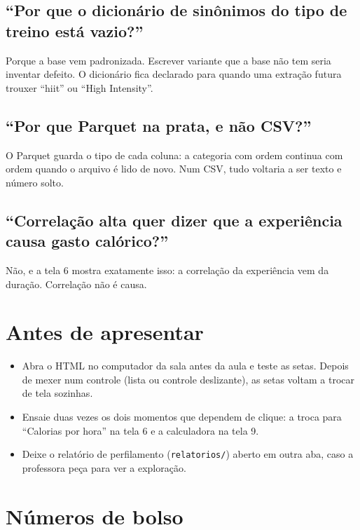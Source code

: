 \documentclass[12pt,a4paper]{article}
\begin{document}
\subsection*{``Por que o dicionário de sinônimos do tipo de treino está vazio?''}
Porque a base vem padronizada. Escrever variante que a base não tem seria inventar defeito. O dicionário fica declarado para quando uma extração futura trouxer ``hiit'' ou ``High Intensity''.

\subsection*{``Por que Parquet na prata, e não CSV?''}
O Parquet guarda o tipo de cada coluna: a categoria com ordem continua com ordem quando o arquivo é lido de novo. Num CSV, tudo voltaria a ser texto e número solto.

\subsection*{``Correlação alta quer dizer que a experiência causa gasto calórico?''}
Não, e a tela 6 mostra exatamente isso: a correlação da experiência vem da duração. Correlação não é causa.

\section{Antes de apresentar}

\begin{itemize}
  \item Abra o HTML no computador da sala antes da aula e teste as setas. Depois de mexer num controle (lista ou controle deslizante), as setas voltam a trocar de tela sozinhas.
  \item Ensaie duas vezes os dois momentos que dependem de clique: a troca para ``Calorias por hora'' na tela 6 e a calculadora na tela 9.
  \item Deixe o relatório de perfilamento (\texttt{relatorios/}) aberto em outra aba, caso a professora peça para ver a exploração.
\end{itemize}

\section{Números de bolso}
\end{document}

